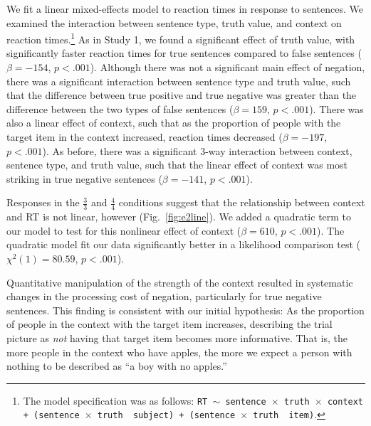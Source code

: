 \documentclass[10pt,letterpaper]{article}
\begin{document}
We fit a linear mixed-effects model to reaction times in response to sentences.  We examined the interaction between sentence type, truth value, and context on reaction times.\footnote{The model specification was as follows: \texttt{RT $\sim$ sentence~$\times$~truth~$\times$~context + (sentence~$\times$~truth~\textbar~subject) +  (sentence~$\times$~truth~\textbar~item)}.}  As in Study 1, we found a significant effect of truth value, with significantly faster reaction times for true sentences compared to false sentences ($\beta= -154$, $p< .001$).  Although there was not a significant main effect of negation, there was a significant interaction between sentence type and truth value, such that the difference between true positive and true negative was greater than the difference between the two types of false sentences ($\beta= 159$, $p< .001$).  There was also a linear effect of context, such that as the proportion of people with the target item in the context increased, reaction times decreased ($\beta= -197$, $p< .001$).  As before, there was a significant 3-way interaction between context, sentence type, and truth value, such that the linear effect of context was most striking in true negative sentences ($\beta= -141$, $p< .001$).

Responses in the $\frac{3}{3}$ and $\frac{4}{4}$ conditions suggest that the relationship between context and RT is not linear, however (Fig.\ \ref{fig:e2line}).  We added a quadratic term to our model to test for this nonlinear effect of context ($\beta= 610 $, $p< .001$).  The quadratic model fit our data significantly better in a likelihood comparison test ($\chi^{2}(1) =80.59$, $p<.001$).  

Quantitative manipulation of the strength of the context resulted in systematic changes in the processing cost of negation, particularly for true negative sentences.  This finding is consistent with our initial hypothesis: As the proportion of people in the context with the target item increases, describing the trial picture as \emph{not} having that target item becomes more informative.  That is, the more people in the context who have apples, the more we expect a person with nothing to be described as ``a boy with no apples.'' 
\end{document}
